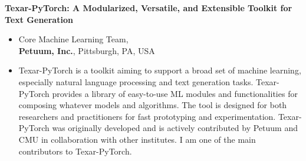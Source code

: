 \documentclass[10pt]{article}
\newenvironment{innerlist}[1][\enskip\textbullet]%
        {\begin{itemize}[#1,leftmargin=*,parsep=0pt,itemsep=0pt,topsep=0pt,partopsep=0pt]}
        {\end{itemize}}
\begin{document}
\textbf{Texar-PyTorch: A Modularized, Versatile, and Extensible Toolkit for Text Generation} 
\begin{innerlist}	
\item[] Core Machine Learning Team,\\
\textbf{Petuum, Inc.}, Pittsburgh, PA, USA
\item Texar-PyTorch is a toolkit aiming to support a broad set of machine learning, especially natural language processing and text generation tasks. Texar-PyTorch provides a library of easy-to-use ML modules and functionalities for composing whatever models and algorithms. The tool is designed for both researchers and practitioners for fast prototyping and experimentation. Texar-PyTorch was originally developed and is actively contributed by Petuum and CMU in collaboration with other institutes. I am one of the main contributors to Texar-PyTorch.
\end{innerlist}



\end{document}
